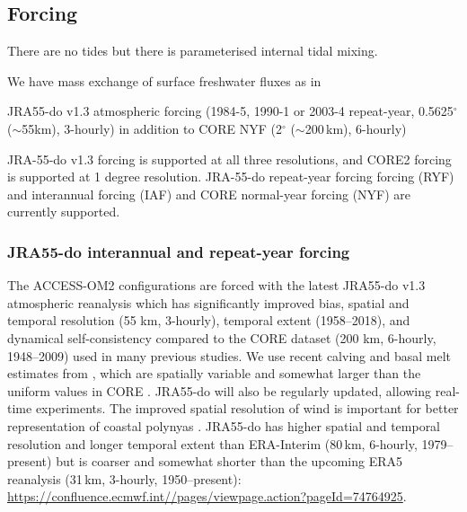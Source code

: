 \documentclass[11pt]{article}
\newcommand{\TODO}[1]{\note{\textcolor{blue}{\textsf{\textbf{TODO: #1}}}}}
\newcommand{\FIXME}[1]{\note{\textcolor{red}{\textsf{\textbf{FIXME: #1}}}}}
\begin{document}
%
%
%
%


\subsection{Forcing}

There are no tides but there is parameterised internal tidal mixing.

We have mass exchange of surface freshwater fluxes as in \citet{BiMarslandUotilaOFarrellFiedlerSullivanGriffiesZhouHirst2013a} \TODO{confirm}

JRA55-do v1.3 atmospheric forcing (1984-5, 1990-1 or 2003-4 repeat-year, 0.5625$^\circ$ ($\sim$55km), 3-hourly) in addition to CORE NYF (2$^\circ$ ($\sim$200\,km), 6-hourly)

JRA-55-do v1.3 forcing is supported at all three resolutions, and CORE2 forcing is supported at 1 degree resolution. 
JRA-55-do repeat-year forcing forcing (RYF) and interannual forcing (IAF) and CORE normal-year forcing (NYF) are currently supported. \FIXME{what about CORE IAF?}

\subsubsection{JRA55-do interannual and repeat-year forcing}

The ACCESS-OM2 configurations are forced with the latest JRA55-do v1.3 atmospheric reanalysis \citep{TsujinoETAL2018a} which has significantly improved bias, spatial and temporal resolution (55 km, 3-hourly), temporal extent (1958--2018), and dynamical self-consistency compared to the CORE dataset (200 km, 6-hourly, 1948--2009) used in many previous studies. We use recent calving and basal melt estimates from \citet{DepoorterBamberGriggsLenaertsLigtenbergBroekeMoholdt2013a}, which are spatially variable and somewhat larger than the uniform values in CORE \citep{TsujinoETAL2018a}. JRA55-do will also be regularly updated, allowing real-time experiments. The improved spatial resolution of wind is important for better representation of coastal polynyas \citep{StosselZhangVihma2011a, ZhangVihmaStosselUotila2015a}.
JRA55-do has higher spatial and temporal resolution and longer temporal extent than ERA-Interim (80\,km, 6-hourly, 1979--present) %
but is coarser and somewhat shorter than the upcoming ERA5 reanalysis (31\,km, 3-hourly, 1950--present): \url{https://confluence.ecmwf.int//pages/viewpage.action?pageId=74764925}.%
\end{document}
